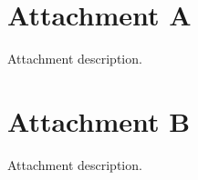 \begin{appendices}
\section*{Attachment A}

Attachment description.



\newpage
\section*{Attachment B}

Attachment description.

\end{appendices}







